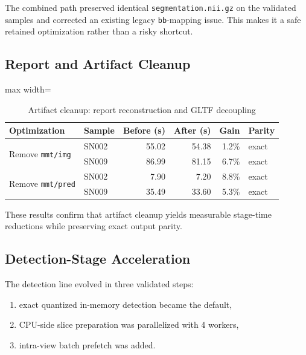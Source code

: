 The combined path preserved identical \texttt{segmentation.nii.gz} on
the validated samples and corrected an existing legacy
\texttt{bb}-mapping issue. This makes it a safe retained optimization
rather than a risky shortcut.

\hypertarget{report-and-artifact-cleanup}{%
\subsection{Report and Artifact
Cleanup}\label{report-and-artifact-cleanup}}

\begin{table}[H]
\centering
\caption{Artifact cleanup: report reconstruction and GLTF decoupling}
\label{tab:artifact-cleanup}
\renewcommand{\arraystretch}{1.15}
\begin{adjustbox}{max width=\textwidth}
\begin{tabular}{l l | rr | r | l}
\toprule
\textbf{Optimization} & \textbf{Sample} & \textbf{Before (s)} & \textbf{After (s)} & \textbf{Gain} & \textbf{Parity} \\
\midrule
\multirow{2}{*}{Remove \texttt{mmt/img}} & SN002 & 55.02 & 54.38 & 1.2\% & exact \\
                                          & SN009 & 86.99 & 81.15 & 6.7\% & exact \\
\midrule
\multirow{2}{*}{Remove \texttt{mmt/pred}} & SN002 & 7.90 & 7.20 & 8.8\% & exact \\
                                           & SN009 & 35.49 & 33.60 & 5.3\% & exact \\
\bottomrule
\end{tabular}
\end{adjustbox}
\end{table}

These results confirm that artifact cleanup yields measurable stage-time reductions while preserving exact output parity.

\hypertarget{detection-stage-acceleration}{%
\subsection{Detection-Stage
Acceleration}\label{detection-stage-acceleration}}

The detection line evolved in three validated steps:

\begin{enumerate}
\def\labelenumi{\arabic{enumi}.}
\tightlist
\item
  exact quantized in-memory detection became the default,
\item
  CPU-side slice preparation was parallelized with 4 workers,
\item
  intra-view batch prefetch was added.
\end{enumerate}

